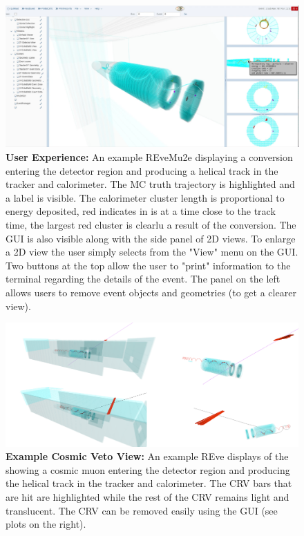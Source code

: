  \begin{figure}[htb]
\begin{center}
\includegraphics[width=0.9\linewidth]{figures/2D-REve-label.png}
\caption{\textbf{User Experience:} An example REveMu2e displaying a conversion entering the detector region and producing a helical track in the tracker and calorimeter. The MC truth trajectory is highlighted and a label is visible. The calorimeter cluster length is proportional to energy deposited, red indicates in is at a time close to the track time, the largest red cluster is clearlu a result of the conversion. The GUI is also visible along with the side panel of 2D views. To enlarge a 2D view the user simply selects from the "View" menu on the GUI. Two buttons at the top allow the user to "print" information to the terminal regarding the details of the event. The panel on the left allows users to remove event objects and geometries (to get a clearer view).}
\label{fig:teve_3D_label}
\end{center}
\end{figure}


 \begin{figure}[htb]
\begin{center}
\includegraphics[width=0.9\linewidth]{figures/REve_cosmics.png}
\caption{\textbf{Example Cosmic Veto View:} An example REve displays of the showing a cosmic muon entering the detector region and producing the helical track in the tracker and calorimeter. The CRV bars that are hit are highlighted while the rest of the CRV remains light and translucent. The CRV can be removed easily using the GUI  (see plots on the right).}
\label{fig:teve_3D_cosmics}
\end{center}
\end{figure}




